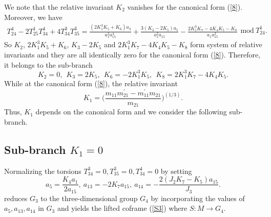 \documentclass[12pt]{article}
\begin{document}
We note that the relative invariant $K_2$ vanishes for the canonical form (\ref{8}).  Moreover, we have
\begin{equation}
\label{eq:array}
\left.
\begin{array}{l}
T^4_{24}-2T^1_{25}T^4_{34}+4T^3_{34}T^3_{35}=\frac{(2K_1^3K_5+K_6)a_3}{a_1^2a_{15}^4}+\frac{3(K_3-2K_5)a_5}{a_1^2a_{15}}-\frac{2K_1^3K_7-4K_4K_5-K_8}{a_1a_{15}^2}
\end{array}
\right.\text{mod}~T^1_{24}.
\end{equation} So $K_2$, $2K_1^3K_5+K_6$, $K_3-2K_5$ and $2K_1^3K_7-4K_4K_5-K_8$ form system of relative invariants and they are all identically zero for the canonical form (\ref{8}). Therefore, it belongs to the sub-branch 
\begin{equation}
K_2=0,~~K_3=2K_5,~~K_6=-2K_1^3K_5,~~K_8=2K_1^3K_7-4K_4K_5.
\end{equation}
  While at the canonical form (\ref{8}), the relative invariant 
\begin{equation}
K_1=\bigg(\frac{m_{11}m_{21}^{\prime}-m_{11}^{\prime}m_{21}}{m_{21}}\bigg)^{(1/3)}.
\end{equation}
 Thus, $K_1$ depends on the canonical form and we consider the following sub-branch.\\



\subsection{ Sub-branch $K_1=0$}

Normalizing the torsions $ T^3_{34}=0, T^3_{35}=0, T^4_{34}=0$ by setting 
\begin{equation}
a_5=\frac{K_4a_1}{2a_{15}}, ~a_{13}=-2K_7a_{15}, ~a_{14}=-\frac{2(J_2K_7-K_5)a_{15}}{J_3}.
\end{equation}
 reduces $G_3$ to the three-dimensional group $G_4$ by incorporating the values of $a_5, a_{13}, a_{14}$ in $G_3$ and yields the lifted coframe (\ref{S3}) where $S:M\rightarrow G_4$.\\
\end{document}
